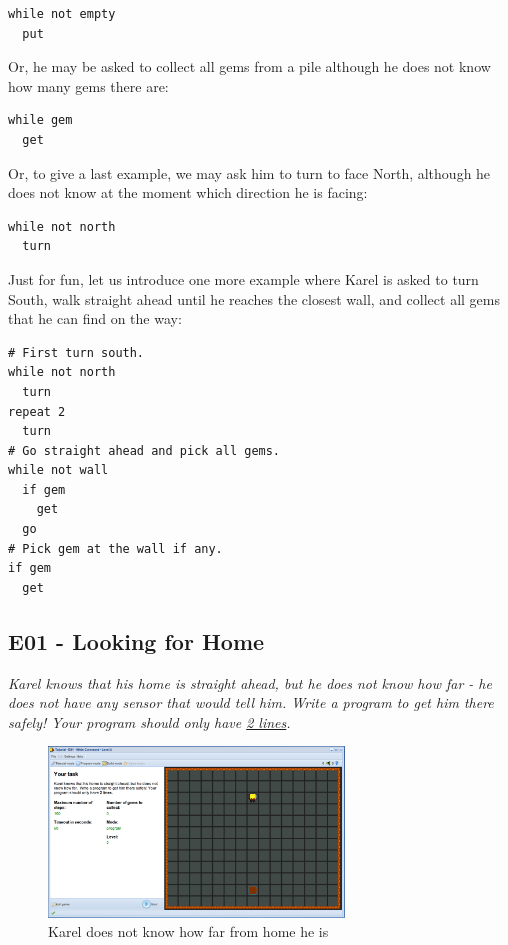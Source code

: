 \documentclass[article,A4,12pt]{llncs}
\begin{document}
\begin{verbatim}
while not empty
  put
\end{verbatim}
Or, he may be asked to collect all gems from a pile although he does
not know how many gems there are:

\begin{verbatim}
while gem
  get
\end{verbatim}
Or, to give a last example, we may ask him to turn to face North, 
although he does not know at the moment which direction he is
facing:

\begin{verbatim}
while not north
  turn
\end{verbatim}
Just for fun, let us introduce one more example where Karel is asked to 
turn South, walk straight ahead until he reaches the closest wall, and 
collect all gems that he can find on the way:

{\small
\begin{verbatim}
# First turn south.
while not north
  turn
repeat 2
  turn
# Go straight ahead and pick all gems.
while not wall
  if gem
    get
  go
# Pick gem at the wall if any.
if gem
  get
\end{verbatim}
}

\newpage
\subsection{E01 - Looking for Home}

{\em Karel knows that his home is straight ahead, but he does not know how far - he does not 
have any sensor that would tell him. 
Write a program to get him there safely! Your program should only have \underline{2 lines}.}\\[-7mm]

\begin{figure}[!ht]
\begin{center}
\includegraphics[width=0.7\textwidth]{img/e01.png}
\end{center}
\vspace{-4mm}
\caption{Karel does not know how far from home he is}
\label{fig:e01}
\vspace{-12mm}
\end{figure}
\noindent
\end{document}
